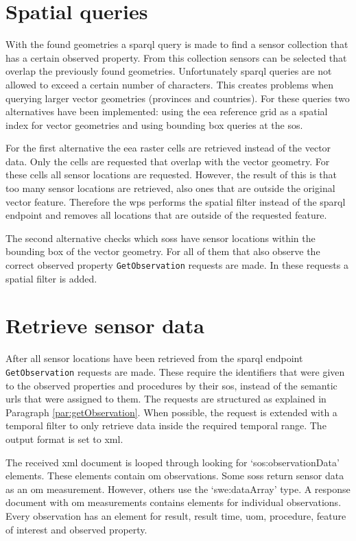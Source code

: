 \section{Spatial queries}
With the found geometries a \ac{sparql} query is made to find a sensor collection that has a certain observed property. From this collection sensors can be selected that overlap the previously found geometries. Unfortunately \ac{sparql} queries are not allowed to exceed a certain number of characters. This creates problems when querying larger vector geometries (provinces and countries). For these queries two alternatives have been implemented: using the \ac{eea} reference grid as a spatial index for vector geometries and using bounding box queries at the \ac{sos}. 

For the first alternative the \ac{eea} raster cells are retrieved instead of the vector data. Only the cells are requested that overlap with the vector geometry. For these cells all sensor locations are requested. However, the result of this is that too many sensor locations are retrieved, also ones that are outside the original vector feature. Therefore the \ac{wps} performs the spatial filter instead of the \ac{sparql} endpoint and removes all locations that are outside of the requested feature.

The second alternative checks which \aclp{sos} have sensor locations within the bounding box of the vector geometry. For all of them that also observe the correct observed property \texttt{GetObservation} requests are made. In these requests a spatial filter is added. 


\section{Retrieve sensor data}
After all sensor locations have been retrieved from the \ac{sparql} endpoint \texttt{GetObservation} requests are made. These require the identifiers that were given to the observed properties and procedures by their \ac{sos}, instead of the semantic \acp{url} that were assigned to them. The requests are structured as explained in Paragraph \ref{par:getObservation}. When possible, the request is extended with a temporal filter to only retrieve data inside the required temporal range. The output format is set to \ac{xml}.

\begin{sloppypar}
The received \ac{xml} document is looped through looking for `sos:observationData' elements. These elements contain \ac{om} observations. Some \aclp{sos} return sensor data as an \ac{om} measurement. However, others use the `\ac{swe}:dataArray' type. A response document with \ac{om} measurements contains elements for individual observations. Every observation has an element for result, result time, \ac{uom}, procedure, feature of interest and observed property.  
\end{sloppypar}

